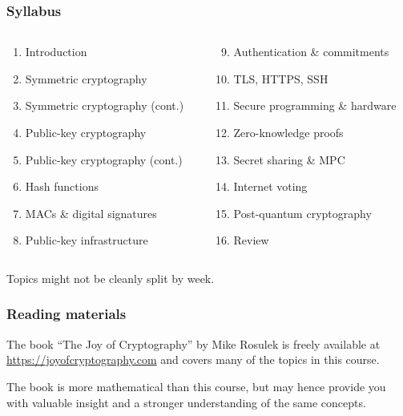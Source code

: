 \begin{frame}
  \frametitle{Syllabus}

  \begin{columns}[t]
    \begin{column}{.4\textwidth}
      \begin{enumerate}
        \item Introduction
        \item Symmetric cryptography
        \item Symmetric cryptography (cont.)
        \item Public-key cryptography
        \item Public-key cryptography (cont.)
        \item Hash functions
        \item MACs \& digital signatures
        \item Public-key infrastructure
      \end{enumerate}
    \end{column}

    \begin{column}{.4\textwidth}
      \begin{enumerate}\setcounter{enumi}{8}
        \item Authentication \& commitments
        \item TLS, HTTPS, SSH
        \item Secure programming \& hardware
        \item Zero-knowledge proofs
        \item Secret sharing \& MPC
        \item Internet voting
        \item Post-quantum cryptography
        \item Review
      \end{enumerate}
    \end{column}
  \end{columns}

  \vspace*{2em}

  \pause
  Topics might not be cleanly split by week.
\end{frame}

\begin{frame}
  \frametitle{Reading materials}

  The book \enquote{The Joy of Cryptography} by Mike Rosulek is freely available at \url{https://joyofcryptography.com} and covers many of the topics in this course.

  \vspace*{1em}

  The book is more mathematical than this course, but may hence provide you with valuable insight and a stronger understanding of the same concepts. 
\end{frame}


